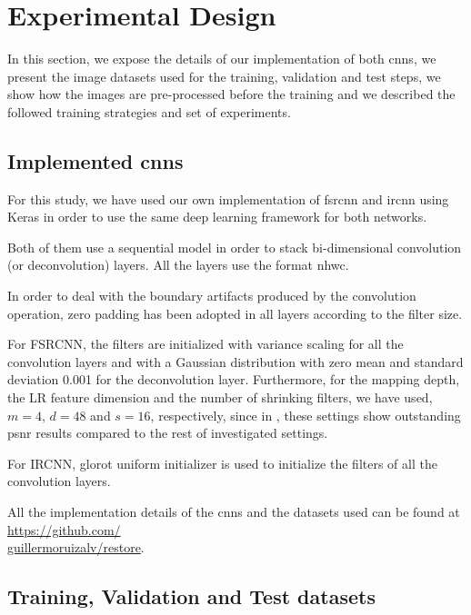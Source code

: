 \section{Experimental Design}\label{sec:experimental_design}

In this section, we expose the details of our implementation of both \glspl{cnn}, we present the image datasets used for the training, validation and test steps, we show how the images are pre-processed before the training and we described the followed training strategies and set of experiments.

\subsection{Implemented \glspl{cnn}}
For this study, we have used our own implementation of \gls{fsrcnn} and \gls{ircnn} using Keras \cite{KERAS} in order to use the same deep learning framework for both networks.

Both of them use a sequential model in order to stack bi-dimensional convolution (or deconvolution) layers. All the layers use the format \gls{nhwc}.

In order to deal with the boundary artifacts produced by the convolution operation, zero padding has been adopted in all layers according to the filter size.

For FSRCNN, the filters are initialized with variance scaling for all the convolution layers and with a Gaussian distribution with zero mean and standard deviation 0.001 for the deconvolution layer. Furthermore, for the mapping depth, the LR feature dimension and the number of shrinking filters, we have used, $m=4$, $d=48$ and $s=16$, respectively, since in \cite{FSRCNN}, these settings show outstanding \gls{psnr} results compared to the rest of investigated settings.

For IRCNN, glorot uniform initializer \cite{XAVIER} is used to initialize the filters of all the convolution layers.

All the implementation details of the \glspl{cnn} and the datasets used can be found at \href{https://github.com/guillermoruizalv/restore}{https://github.com/\\guillermoruizalv/restore}.

\subsection{Training, Validation and Test datasets}

